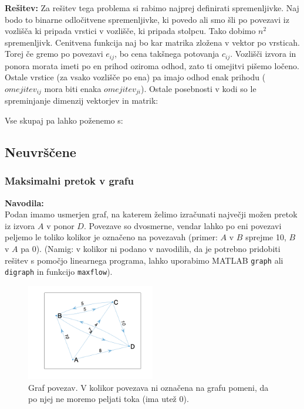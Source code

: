 \documentclass[a4paper,11pt]{article}
\begin{document}
\vspace{5mm} \noindent \textbf{Rešitev:}
Za rešitev tega problema si rabimo najprej definirati spremenljivke. Naj bodo to binarne odločitvene spremenljivke, ki povedo ali smo šli po povezavi iz vozlišča ki pripada vrstici v vozlišče, ki pripada stolpcu. Tako dobimo $n^2$ spremenljivk. Cenitvena funkcija naj bo kar matrika zložena v vektor po vrsticah. Torej če gremo po povezavi $e_{ij}$, bo cena takšnega potovanja $c_{ij}$. Vozlišči izvora in ponora morata imeti po en prihod oziroma odhod, zato ti omejitvi pišemo ločeno. Ostale vrstice (za vsako vozlišče po ena) pa imajo odhod enak prihodu ($omejitev_{ij}$ mora biti enaka $omejitev_{ji}$). Ostale posebnosti v kodi so le spreminjanje dimenzij vektorjev in matrik:

Vse skupaj pa lahko poženemo s:



\subsection{Neuvrščene}

\subsubsection{Maksimalni pretok v grafu}

\textbf{Navodila:} \\
Podan imamo usmerjen graf, na katerem želimo izračunati največji možen pretok iz izvora $A$ v ponor $D$. Povezave so dvosmerne, vendar lahko po eni povezavi peljemo le toliko kolikor je označeno na povezavah (primer: $A$ v $B$ sprejme 10, $B$ v $A$ pa 0). (Namig: v kolikor ni podano v navodilih, da je potrebno pridobiti rešitev s pomočjo linearnega programa, lahko uporabimo MATLAB \texttt{graph} ali \texttt{digraph} in funkcijo \texttt{maxflow}).

\begin{figure}[hbt]
	\centering
	\includegraphics[width=0.5\textwidth]{images/unlisted1_graph.png}
	\caption{Graf povezav. V kolikor povezava ni označena na grafu pomeni, da po njej ne moremo peljati toka (ima utež 0).}
	\label{img:unlisted1_graph}
\end{figure}
\end{document}
